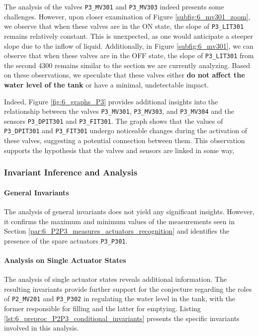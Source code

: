 The analysis of the valves \texttt{P3\_MV301} and \texttt{P3\_MV303} indeed presents some challenges. However, upon closer examination of Figure \ref{subfig:6_mv301_zoom}, we observe that when these valves are in the ON state, the slope of \texttt{P3\_LIT301} remains relatively constant. This is unexpected, as one would anticipate a steeper slope due to the inflow of liquid. Additionally, in Figure \ref{subfig:6_mv301}, we can observe that when these valves are in the OFF state, the slope of \texttt{P3\_LIT301} from the second 4300 remains similar to the section we are currently analyzing. Based on these observations, we speculate that these valves either \textbf{do not affect the water level of the tank} or have a minimal, undetectable impact.

\bigskip
Indeed, Figure \ref{fig:6_graphs_P3} provides additional insights into the relationship between the valves \texttt{P3\_MV301}, \texttt{P3\_MV303}, and \texttt{P3\_MV304} and the sensors \texttt{P3\_DPIT301} and \texttt{P3\_FIT301}. The graph shows that the values of \texttt{P3\_DPIT301} and \texttt{P3\_FIT301} undergo noticeable changes during the activation of these valves, suggesting a potential connection between them. This observation supports the hypothesis that the valves and sensors are linked in some way,

\subsubsection{Invariant Inference and Analysis}
\label{subsubsec:6_P2P3_invariants}

\paragraph{General Invariants}
\label{par:6_P2P3_general_invariant}

The analysis of general invariants does not yield any significant insights. However, it confirms the maximum and minimum values of the measurements seen in Section \ref{par:6_P2P3_measures_actuators_recognition} and identifies the presence of the spare actuators \texttt{P3\_P301}. 

\paragraph{Analysis on Single Actuator States}
\label{par:6_P2P3_single_act_states}
The analysis of single actuator states reveals additional information. The resulting invariants provide further support for the conjecture regarding the roles of \texttt{P2\_MV201} and \texttt{P3\_P302} in regulating the water level in the tank, with the former responsible for filling and the latter for emptying. Listing \ref{lst:6_preproc_P2P3_conditional_invariants} presents the specific invariants involved in this analysis.


